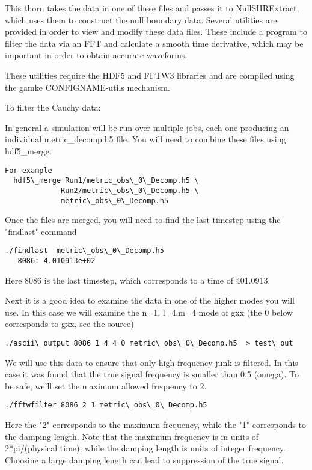 This thorn takes the data in one of these files and passes it to
NullSHRExtract, which uses them to construct the null boundary data.
Several utilities are provided in order to view and modify these data
files. These include a program to filter the data via an FFT and
calculate a smooth time derivative, which may be important in order
to obtain accurate waveforms.

These utilities require the HDF5 and FFTW3 libraries and are  
compiled using the gamke CONFIGNAME-utils mechanism.

To filter the Cauchy data:

  In general a simulation will be run over multiple jobs, each one
producing an individual metric\_decomp.h5 file. You will need to
combine these files using hdf5\_merge.

\begin{verbatim}
For example
  hdf5\_merge Run1/metric_obs\_0\_Decomp.h5 \
             Run2/metric\_obs\_0\_Decomp.h5 \
             metric\_obs\_0\_Decomp.h5
\end{verbatim}

Once the files are merged, you will need to find the last timestep
using the "findlast" command

\begin{verbatim}
./findlast  metric\_obs\_0\_Decomp.h5
   8086: 4.010913e+02
\end{verbatim}

Here 8086 is the last timestep, which corresponds to a time of 401.0913.

Next it is a good idea to examine the data in one of the higher modes
you will use. In this case we will examine the n=1, l=4,m=4 mode
of gxx (the 0 below corresponds to gxx, see the source)

\begin{verbatim}
./ascii\_output 8086 1 4 4 0 metric\_obs\_0\_Decomp.h5  > test\_out
\end{verbatim}

We will use this data to ensure that only high-frequency junk is
filtered. In this case it was found that the true signal frequency
is smaller than 0.5 (omega). To be safe, we'll set the maximum
allowed frequency to 2.

\begin{verbatim}
./fftwfilter 8086 2 1 metric\_obs\_0\_Decomp.h5
\end{verbatim}

Here the "2" corresponds to the maximum frequency, while the "1"
corresponds to the damping length. Note that the maximum frequency is
in units of 2*pi/(physical time), while the damping length is units of
integer frequency. Choosing a large damping length can lead to suppression
of the true signal.

